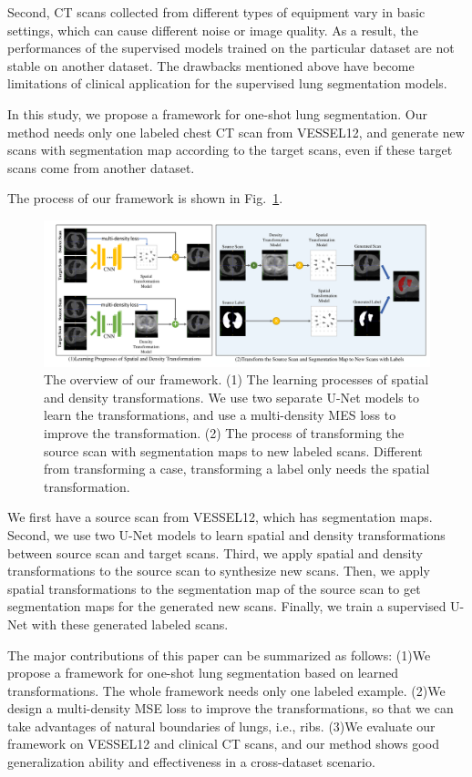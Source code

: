 \documentclass{article}
\begin{document}
Second, CT scans collected from different types of equipment vary in basic settings, which can cause different noise or image quality. As a result, the performances of the supervised models trained on the particular dataset are not stable on another dataset.
The drawbacks mentioned above have become limitations of clinical application for the supervised lung segmentation models.

In this study, we propose a framework for one-shot lung segmentation. Our method needs only one labeled chest CT scan from VESSEL12, and generate new scans with segmentation map according to the target scans, even if these target scans come from another dataset.

The process of our framework is shown in Fig.~\ref{transarti}.
\begin{figure}[htbp]
    \centerline{\includegraphics[width=180mm]{transarti2.pdf}}
    \vspace{-0.5cm}
    \caption{The overview of our framework. (1) The learning processes of spatial and density transformations. We use two separate U-Net models to learn the transformations, and use a multi-density MES loss to improve the transformation. (2) The process of transforming the source scan with segmentation maps to new labeled scans. Different from transforming a case, transforming a label only needs the spatial transformation.
    }
    \vspace{-0.3cm}
    \label{transarti}
    \end{figure}
We first have a source scan from VESSEL12, which has segmentation maps. Second, we use two U-Net models to learn spatial and density transformations between source scan and target scans. Third, we apply spatial and density transformations to the source scan to synthesize new scans. Then, we apply spatial transformations to the segmentation map of the source scan to get segmentation maps for the generated new scans. Finally, we train a supervised U-Net with these generated labeled scans.


The major contributions of this paper can be summarized as follows:
(1)We propose a framework for one-shot lung segmentation based on learned transformations. The whole framework needs only one labeled example. (2)We design a multi-density MSE loss to improve the transformations, so that we can take advantages of natural boundaries of lungs, i.e., ribs. (3)We evaluate our framework on VESSEL12 and clinical CT scans, and our method shows good generalization ability and effectiveness in a cross-dataset scenario.
\end{document}
